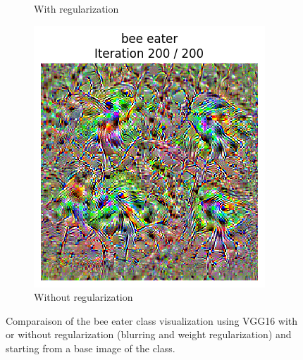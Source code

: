 \begin{figure}[H]
\begin{subfigure}[t]{.33\textwidth}
        \caption{With regularization}
        \label{fig:class_viz_reg:sub2}
    \end{subfigure}%
    \begin{subfigure}[t]{.33\textwidth}
        \centering
        \includegraphics[width=\linewidth]{figs/2b/SqueezeNet/SqueezeNet_bird_animated_no_reg_last_frame.png}
        \caption{Without regularization}
        \label{fig:class_viz_reg:sub3}
    \end{subfigure}

    \caption{Comparaison of the bee eater class visualization using VGG16 with or without regularization (blurring and weight regularization) and starting from a base image of the class.}
    \label{fig:class_viz_reg}
\end{figure}

